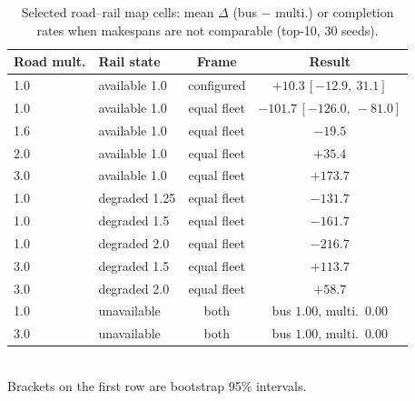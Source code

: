 \documentclass{ieeeaccess}
\begin{document}
\begin{table}[!t]
\caption{Selected road--rail map cells: mean $\Delta$ (bus $-$ multi.) or completion rates when makespans are not comparable (top-10, 30 seeds).}
\label{tab:roadrail}
\centering
\footnotesize
\begin{tabular}{@{}llcc@{}}
\hline
Road mult. & Rail state & Frame & Result \\
\hline
1.0 & available 1.0 & configured & $+10.3\,[-12.9,\ 31.1]$ \\
1.0 & available 1.0 & equal fleet & $-101.7\,[-126.0,\ -81.0]$ \\
1.6 & available 1.0 & equal fleet & $-19.5$ \\
2.0 & available 1.0 & equal fleet & $+35.4$ \\
3.0 & available 1.0 & equal fleet & $+173.7$ \\
1.0 & degraded 1.25 & equal fleet & $-131.7$ \\
1.0 & degraded 1.5 & equal fleet & $-161.7$ \\
1.0 & degraded 2.0 & equal fleet & $-216.7$ \\
3.0 & degraded 1.5 & equal fleet & $+113.7$ \\
3.0 & degraded 2.0 & equal fleet & $+58.7$ \\
1.0 & unavailable & both & bus $1.00$, multi.\ $0.00$ \\
3.0 & unavailable & both & bus $1.00$, multi.\ $0.00$ \\
\hline
\end{tabular}
\\
\footnotesize{Brackets on the first row are bootstrap 95\% intervals.}
\end{table}
\end{document}
